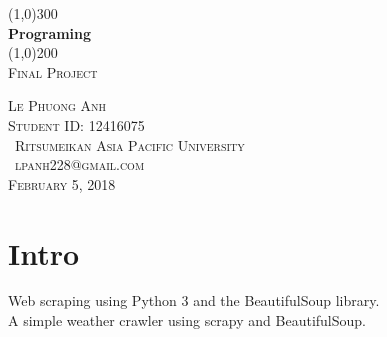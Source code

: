 \documentclass{article}
\begin{document}
\begin{titlepage}
	\begin{center}
	\line(1,0){300}\\
	[0.25in]
	\huge{\bfseries Programing}\\
	[2mm]
	\line(1,0){200}\\
	[1.5cm]
	\textsc{\LARGE Final Project}\\
	[0.75cm]
	\end{center}
	\begin{flushright}
	\textsc{\large Le Phuong Anh\\
	Student ID: 12416075\\
	\ Ritsumeikan Asia Pacific University\\
	\ lpanh228@gmail.com\\
	February 5, 2018\\}
	\end{flushright}
\end{titlepage}

\section{Intro}\label{sec:intro}
Web scraping using Python 3 and the BeautifulSoup library.\\
A simple weather crawler using scrapy and BeautifulSoup.
\end{document}
